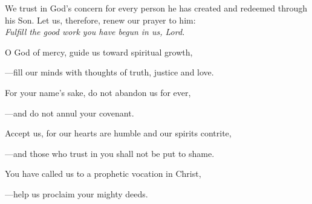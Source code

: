 \intercessions\indent

\begin{hangpar}

We trust in God’s concern for every person he has created and redeemed through his Son. Let us, therefore, renew our prayer to him:\\
\emph{Fulfill the good work you have begun in us, Lord.}

\medskip O God of mercy, guide us toward spiritual growth,

{\color{red}---\thinspace}fill our minds with thoughts of truth, justice and love.

\medskip For your name’s sake, do not abandon us for ever,

{\color{red}---\thinspace}and do not annul your covenant.

\medskip Accept us, for our hearts are humble and our spirits contrite,

{\color{red}---\thinspace}and those who trust in you shall not be put to shame.

\medskip You have called us to a prophetic vocation in Christ,

{\color{red}---\thinspace}help us proclaim your mighty deeds.

\end{hangpar}

